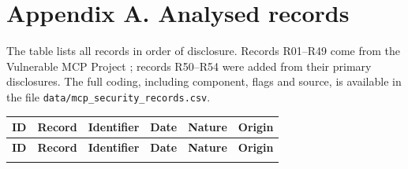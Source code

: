 {}
\chapter*{Appendix A. Analysed records}

\par The table lists all records in order of disclosure. Records R01--R49 come from the Vulnerable MCP Project \cite{vmp}; records R50--R54 were added from their primary disclosures. The full coding, including component, flags and source, is available in the file \texttt{data/mcp\_security\_records.csv}.

\begingroup
\singlespacing
\footnotesize
\setlength{\LTpre}{6pt}
\begin{longtable}{@{} l p{6.4cm} p{3.4cm} l l l @{}}
\toprule
\textbf{ID} & \textbf{Record} & \textbf{Identifier} & \textbf{Date} & \textbf{Nature} & \textbf{Origin} \\
\midrule
\endfirsthead
\toprule
\textbf{ID} & \textbf{Record} & \textbf{Identifier} & \textbf{Date} & \textbf{Nature} & \textbf{Origin} \\
\midrule
\endhead
\bottomrule
\endfoot

\end{longtable}
\endgroup
